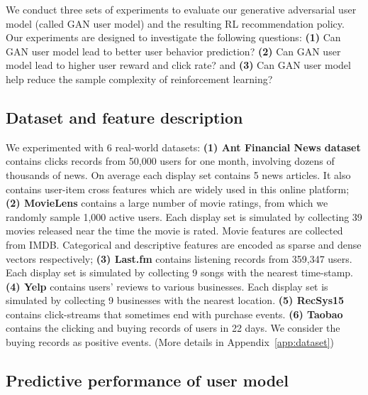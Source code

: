\documentclass{article} %
\begin{document}
We conduct three sets of experiments to evaluate our generative adversarial user model (called {\small GAN} user model) and the resulting RL recommendation policy. Our experiments are designed to investigate the following questions: {\bf (1)} Can {\small GAN} user model lead to better user behavior prediction? {\bf (2)} Can {\small GAN} user model lead to higher user reward and click rate? and {\bf (3)} Can {\small GAN} user model help reduce the sample complexity of reinforcement learning? 

\vspace{-3mm}
\subsection{Dataset and feature description}
\vspace{-3mm}

We experimented with 6 real-world {datasets}: {\bf (1) Ant Financial News dataset} contains clicks records from 50,000 users for one month, involving dozens of thousands of news. On average each display set contains 5 news articles. It also contains user-item cross features which are widely used in this online platform; {\bf (2) MovieLens} contains a large number of movie ratings, from which we randomly sample 1,000 active users. Each display set is simulated by collecting 39 movies released near the time the movie is rated. Movie features are collected from IMDB. Categorical and descriptive features are encoded as sparse and dense vectors respectively; {\bf (3) Last.fm} contains listening records from 359,347 users. Each display set is simulated by collecting 9 songs with the nearest time-stamp. {\bf (4) Yelp} contains users' reviews to various businesses. Each display set is simulated by collecting 9 businesses with the nearest location. {\bf (5) RecSys15} contains click-streams that sometimes end with purchase events. {\bf (6) Taobao} contains the clicking and buying records of users in 22 days. We consider the buying records as positive events.
(More details in Appendix~\ref{app:dataset})
\vspace{-3mm}
\subsection{Predictive performance of user model}\label{sec:experiment1}
\vspace{-3mm} 
\end{document}
